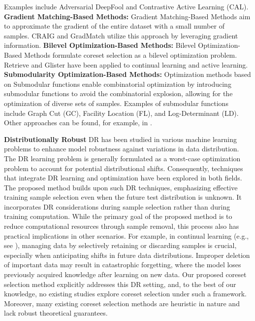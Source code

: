 %
Examples include Adversarial DeepFool\citep{ducoffe2018adversarial} and Contrastive Active Learning (CAL)\citep{margatina2021active}.
%
\textbf{Gradient Matching-Based Methods:}
%
Gradient Matching-Based Methods aim to approximate the gradient of the entire dataset with a small number of samples.
%
CRAIG\citep{mirzasoleiman2020coresets} and GradMatch\citep{killamsetty2021grad} utilize this approach by leveraging gradient information.
%
\textbf{Bilevel Optimization-Based Methods:}
%
Bilevel Optimization-Based Methods formulate coreset selection as a bilevel optimization problem.
%
Retrieve\citep{killamsetty2021retrieve} and Glister\citep{killamsetty2021glister} have been applied to continual learning and active learning.
%
\textbf{Submodularity Optimization-Based Methods:}
%
Optimization methods based on Submodular functions\citep{iyer2013submodular} enable combinatorial optimization by introducing submodular functions to avoid the combinatorial explosion, allowing for the optimization of diverse sets of samples.
%
Examples of submodular functions include Graph Cut (GC), Facility Location (FL), and Log-Determinant (LD)\citep{iyer2021submodular}.
%
Other approaches can be found, for example, in \citet{guo2022deepcore}.

\textbf{Distributionally Robust}
DR has been studied in various machine learning problems to enhance model robustness against variations in data distribution.
%
The DR learning problem is generally formulated as a worst-case optimization problem to account for potential distributional shifts.
%
Consequently, techniques that integrate DR learning and optimization have been explored in both fields.
%
The proposed method builds upon such DR techniques, emphasizing effective training sample selection even when the future test distribution is unknown. It incorporates DR considerations during sample selection rather than during training computation.
%
While the primary goal of the proposed method is to reduce computational resources through sample removal, this process also has practical implications in other scenarios.
%
For example, in continual learning (e.g., see \citet{wang2022memory}), managing data by selectively retaining or discarding samples is crucial, especially when anticipating shifts in future data distributions.
%
Improper deletion of important data may result in catastrophic forgetting\citep{kirkpatrick2017overcoming}, where the model loses previously acquired knowledge after learning on new data.
%
Our proposed coreset selection method explicitly addresses this DR setting, and, to the best of our knowledge, no existing studies explore coreset selection under such a framework.
%
Moreover, many existing coreset selection methods are heuristic in nature and lack robust theoretical guarantees.

